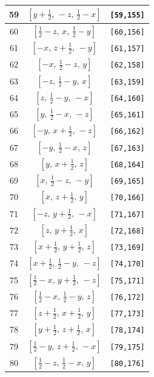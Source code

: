 \documentclass[fleqn,8pt]{jsarticle}
\begin{document}
\begin{longtable}{ccc}
59 & $\left[ y + \frac{1}{2},\, - z,\, \frac{1}{2} - x \right]$ & {\tt [59,155]} \\ \hline
60 & $\left[ \frac{1}{2} - z,\, x,\, \frac{1}{2} - y \right]$ & {\tt [60,156]} \\ \hline
61 & $\left[ - x,\, z + \frac{1}{2},\, - y \right]$ & {\tt [61,157]} \\ \hline
62 & $\left[ - x,\, \frac{1}{2} - z,\, y \right]$ & {\tt [62,158]} \\ \hline
63 & $\left[ - z,\, \frac{1}{2} - y,\, x \right]$ & {\tt [63,159]} \\ \hline
64 & $\left[ z,\, \frac{1}{2} - y,\, - x \right]$ & {\tt [64,160]} \\ \hline
65 & $\left[ y,\, \frac{1}{2} - x,\, - z \right]$ & {\tt [65,161]} \\ \hline
66 & $\left[ - y,\, x + \frac{1}{2},\, - z \right]$ & {\tt [66,162]} \\ \hline
67 & $\left[ - y,\, \frac{1}{2} - x,\, z \right]$ & {\tt [67,163]} \\ \hline
68 & $\left[ y,\, x + \frac{1}{2},\, z \right]$ & {\tt [68,164]} \\ \hline
69 & $\left[ x,\, \frac{1}{2} - z,\, - y \right]$ & {\tt [69,165]} \\ \hline
70 & $\left[ x,\, z + \frac{1}{2},\, y \right]$ & {\tt [70,166]} \\ \hline
71 & $\left[ - z,\, y + \frac{1}{2},\, - x \right]$ & {\tt [71,167]} \\ \hline
72 & $\left[ z,\, y + \frac{1}{2},\, x \right]$ & {\tt [72,168]} \\ \hline
73 & $\left[ x + \frac{1}{2},\, y + \frac{1}{2},\, z \right]$ & {\tt [73,169]} \\ \hline
74 & $\left[ x + \frac{1}{2},\, \frac{1}{2} - y,\, - z \right]$ & {\tt [74,170]} \\ \hline
75 & $\left[ \frac{1}{2} - x,\, y + \frac{1}{2},\, - z \right]$ & {\tt [75,171]} \\ \hline
76 & $\left[ \frac{1}{2} - x,\, \frac{1}{2} - y,\, z \right]$ & {\tt [76,172]} \\ \hline
77 & $\left[ z + \frac{1}{2},\, x + \frac{1}{2},\, y \right]$ & {\tt [77,173]} \\ \hline
78 & $\left[ y + \frac{1}{2},\, z + \frac{1}{2},\, x \right]$ & {\tt [78,174]} \\ \hline
79 & $\left[ \frac{1}{2} - y,\, z + \frac{1}{2},\, - x \right]$ & {\tt [79,175]} \\ \hline
80 & $\left[ \frac{1}{2} - z,\, \frac{1}{2} - x,\, y \right]$ & {\tt [80,176]} \\ \hline

\end{longtable}
\end{document}
